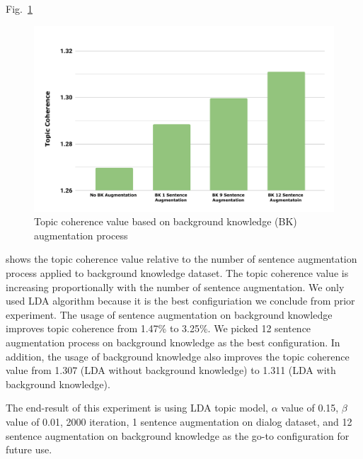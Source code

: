 \documentclass[10pt, conference, compsocconf]{IEEEtran}
\begin{document}
Fig.~\ref{fig_tme2}
\begin{figure}[b]
	\includegraphics[scale=0.425]{new-topic2.pdf}
	\caption{Topic coherence value based on background knowledge (BK) augmentation process}
\label{fig_tme2}
\end{figure}
shows the topic coherence value relative to the number of sentence augmentation process applied to background knowledge dataset. The topic coherence value is increasing proportionally with the number of sentence augmentation. We only used LDA algorithm because it is the best configuriation we conclude from prior experiment. The usage of sentence augmentation on background knowledge improves topic coherence from 1.47\% to 3.25\%. We picked 12 sentence augmentation process on background knowledge as the best configuration. In addition, the usage of background knowledge also improves the topic coherence value from 1.307 (LDA without background knowledge) to 1.311 (LDA with background knowledge).

The end-result of this experiment is using LDA topic model, $\alpha$ value of 0.15, $\beta$ value of 0.01, 2000 iteration, 1 sentence augmentation on dialog dataset, and 12 sentence augmentation on background knowledge as the go-to configuration for future use.
\end{document}
